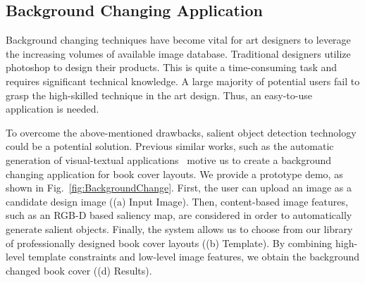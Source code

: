 \documentclass[journal]{IEEEtran}
\newcommand{\figref}[1]{Fig.~\ref{#1}}
\newcommand{\fdp}[1]{#1}
\begin{document}
\subsection{Background Changing Application}
Background \fdp{changing} techniques \fdp{have} become vital for art designers to
leverage the increasing volumes of available image database.
Traditional designers utilize photoshop to design
their products. This is quite \fdp{a} time-consuming task and
requires \fdp{significant} technical knowledge.
A large majority of potential users fail to grasp the \fdp{high-skilled} technique
in the art design. Thus, an easy-to-use application is needed.

To overcome the above-mentioned drawbacks, salient object detection
technology \fdp{could} be a potential solution.
Previous similar work\fdp{s}, such as \fdp{the} automatic generation of
visual-textual applications~\cite{yang2016automatic,jahanian2013recommendation}
motive us to create \fdp{a} background changing application for book cover layouts.
We \fdp{provide} a prototype demo, as shown in \figref{fig:BackgroundChange}.
First, the user can upload \fdp{an} image
\fdp{as} a candidate \fdp{design} image ((a) Input Image). Then, content-based image features, such as \fdp{an} RGB-D based saliency map, \fdp{are} considered in \fdp{order to automatically generate} salient object\fdp{s}. Finally, the system allows us to choose from
our library of professionally designed book cover layouts ((b) Template).
By combining high-level template constraints and low-level image features, we
obtain the background changed book cover ((d) Results). 
\end{document}
